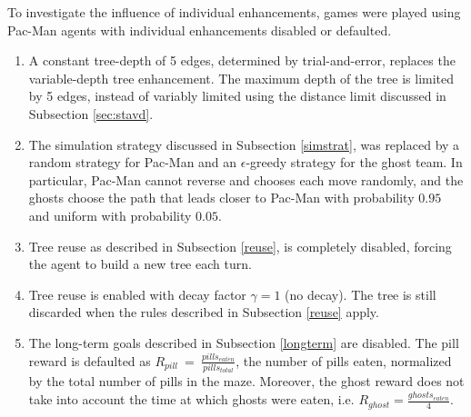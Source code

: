 \documentclass[journal]{IEEEtran}
\begin{document}
To investigate the influence of individual enhancements, games were played using Pac-Man agents with individual enhancements disabled or defaulted. 
\begin{enumerate}
\item A constant tree-depth of 5 edges, determined by trial-and-error, replaces the variable-depth tree enhancement. The maximum depth of the tree is limited by 5 edges, instead of variably limited using the distance limit discussed in Subsection \ref{sec:stavd}.
\item The simulation strategy discussed in Subsection \ref{simstrat}, was replaced by a random strategy for Pac-Man and an $\epsilon$-greedy strategy for the ghost team. In particular, Pac-Man cannot reverse and chooses each move randomly, and the ghosts choose the path that leads closer to Pac-Man with probability $0.95$ and uniform with probability $0.05$.
\item Tree reuse as described in Subsection \ref{reuse}, is completely disabled, forcing the agent to build a new tree each turn.
\item Tree reuse is enabled with decay factor $\gamma = 1$ (no decay). The tree is still discarded when the rules described in Subsection \ref{reuse} apply.
\item The long-term goals described in Subsection \ref{longterm} are disabled. The pill reward is defaulted as $R_{pill}~=~\frac{pills_{eaten}}{pills_{total}}$, the number of pills eaten, normalized by the total number of pills in the maze. Moreover, the ghost reward does not take into account the time at which ghosts were eaten, i.e. $R_{ghost}=\frac{ghosts_{eaten}}{4}$.
\end{enumerate}
\end{document}
